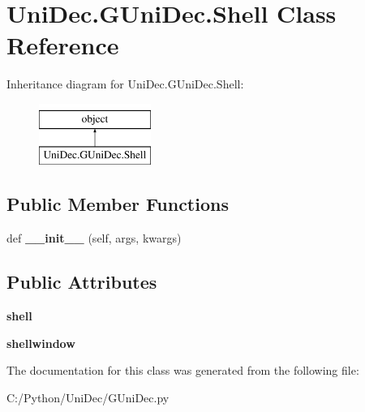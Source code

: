 \hypertarget{class_uni_dec_1_1_g_uni_dec_1_1_shell}{}\section{Uni\+Dec.\+G\+Uni\+Dec.\+Shell Class Reference}
\label{class_uni_dec_1_1_g_uni_dec_1_1_shell}
Inheritance diagram for Uni\+Dec.\+G\+Uni\+Dec.\+Shell\+:\begin{figure}[H]
\begin{center}
\leavevmode
\includegraphics[height=2.000000cm]{class_uni_dec_1_1_g_uni_dec_1_1_shell}
\end{center}
\end{figure}
\subsection*{Public Member Functions}
\begin{DoxyCompactItemize}
\item 
\hypertarget{class_uni_dec_1_1_g_uni_dec_1_1_shell_a574ce86e4262d4a287fa7de82f10fdb0}{}def {\bfseries \+\_\+\+\_\+init\+\_\+\+\_\+} (self, args, kwargs)\label{class_uni_dec_1_1_g_uni_dec_1_1_shell_a574ce86e4262d4a287fa7de82f10fdb0}

\end{DoxyCompactItemize}
\subsection*{Public Attributes}
\begin{DoxyCompactItemize}
\item 
\hypertarget{class_uni_dec_1_1_g_uni_dec_1_1_shell_a0c449c90c0340d8fe0385110482ee507}{}{\bfseries shell}\label{class_uni_dec_1_1_g_uni_dec_1_1_shell_a0c449c90c0340d8fe0385110482ee507}

\item 
\hypertarget{class_uni_dec_1_1_g_uni_dec_1_1_shell_a92e1e6e9000ee5b99a6118dd48753548}{}{\bfseries shellwindow}\label{class_uni_dec_1_1_g_uni_dec_1_1_shell_a92e1e6e9000ee5b99a6118dd48753548}

\end{DoxyCompactItemize}


The documentation for this class was generated from the following file\+:\begin{DoxyCompactItemize}
\item 
C\+:/\+Python/\+Uni\+Dec/G\+Uni\+Dec.\+py\end{DoxyCompactItemize}
